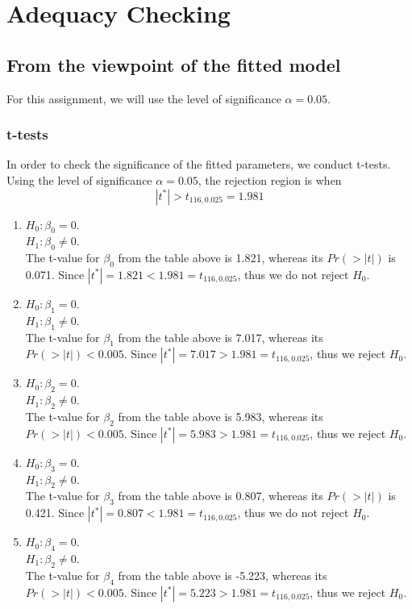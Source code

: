 \documentclass[english]{article}
\begin{document}
\section{Adequacy Checking}

\subsection{From the viewpoint of the fitted model}
For this assignment, we will use the level of significance $\alpha = 0.05$. 

\subsubsection{t-tests} \label{section311}
In order to check the significance of the fitted parameters, we conduct t-tests. Using the level of significance $\alpha = 0.05$, the rejection region is when 
$$|t^*| > t_{116, 0.025} = 1.981$$
\begin{enumerate}\itemsep0pt
\item $H_0 :\beta_0 = 0$. \\
$H_1 : \beta_0 \neq 0$. \\
The t-value for $\beta_0$ from the table above is 1.821, whereas its $Pr(>|t|)$ is 0.071. Since $|t^*| = 1.821 < 1.981 = t_{116, 0.025}$, thus we do not reject $H_0$.
\item $H_0 : \beta_1 = 0$. \\
$H_1 : \beta_1 \neq 0$. \\
The t-value for $\beta_1$ from the table above is 7.017, whereas its $Pr(>|t|) < 0.005$. Since $|t^*| = 7.017 > 1.981 = t_{116, 0.025}$, thus we reject $H_0$.
\item $H_0 : \beta_2 = 0$. \\
$H_1 : \beta_2 \neq 0$. \\
The t-value for $\beta_2$ from the table above is 5.983, whereas its $Pr(>|t|) < 0.005$. Since $|t^*| = 5.983 > 1.981 = t_{116, 0.025}$, thus we reject $H_0$. 
\item $H_0 :\beta_3 = 0$. \\
$H_1 : \beta_2 \neq 0$. \\
The t-value for $\beta_3$ from the table above is 0.807, whereas its $Pr(>|t|)$ is 0.421. Since $|t^*| = 0.807 < 1.981 = t_{116, 0.025}$, thus we do not reject $H_0$. 
\item $H_0 : \beta_4 = 0$. \\
$H_1 : \beta_2 \neq 0$. \\
The t-value for $\beta_4$ from the table above is -5.223, whereas its $Pr(>|t|) < 0.005$. Since $|t^*| = 5.223 > 1.981 = t_{116, 0.025}$, thus we reject $H_0$. 
\end{enumerate}
\end{document}
